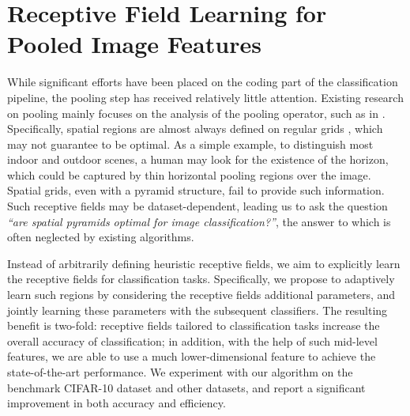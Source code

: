 \section{Receptive Field Learning for Pooled Image Features}\label{sec:grafting}
While significant efforts have been placed on the coding part of the classification pipeline, the pooling step has received relatively little attention. Existing research on pooling mainly focuses on the analysis of the pooling operator, such as in \cite{Boureau:2010wz}. Specifically, spatial regions are almost always defined on regular grids \cite{Yang:2009vb}, which may not guarantee to be optimal. As a simple example, to distinguish most indoor and outdoor scenes, a human may look for the existence of the horizon, which could be captured by thin horizontal pooling regions over the image. Spatial grids, even with a pyramid structure, fail to provide such information. Such receptive fields may be dataset-dependent, leading us to ask the question \emph{``are spatial pyramids optimal for image classification?''}, the answer to which is often neglected by existing algorithms.

Instead of arbitrarily defining heuristic receptive fields, we aim to explicitly learn the receptive fields for classification tasks. Specifically, we propose to adaptively learn such regions by considering the receptive fields additional parameters, and jointly learning these parameters with the subsequent classifiers. The resulting benefit is two-fold: receptive fields tailored to classification tasks increase the overall accuracy of classification; in addition, with the help of such mid-level features, we are able to use a much lower-dimensional feature to achieve the state-of-the-art performance. We experiment with our algorithm on the benchmark CIFAR-10 dataset and other datasets, and report a significant improvement in both accuracy and efficiency.

